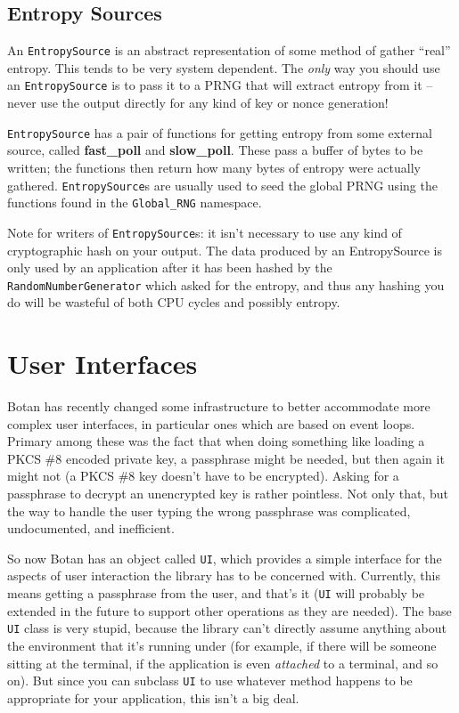 \documentclass{article}
\newcommand{\function}[1]{\textbf{#1}}
\newcommand{\type}[1]{\texttt{#1}}
\newcommand{\namespace}[1]{\texttt{#1}}
\begin{document}
\subsection{Entropy Sources}

An \type{EntropySource} is an abstract representation of some method of gather
``real'' entropy. This tends to be very system dependent. The \emph{only} way
you should use an \type{EntropySource} is to pass it to a PRNG that will
extract entropy from it -- never use the output directly for any kind of key or
nonce generation!

\type{EntropySource} has a pair of functions for getting entropy from some
external source, called \function{fast\_poll} and \function{slow\_poll}. These
pass a buffer of bytes to be written; the functions then return how many bytes
of entropy were actually gathered. \type{EntropySource}s are usually used to
seed the global PRNG using the functions found in the \namespace{Global\_RNG}
namespace.

Note for writers of \type{EntropySource}s: it isn't necessary to use any kind
of cryptographic hash on your output. The data produced by an EntropySource is
only used by an application after it has been hashed by the
\type{RandomNumberGenerator} which asked for the entropy, and thus any hashing
you do will be wasteful of both CPU cycles and possibly entropy.

\pagebreak
\section{User Interfaces}

Botan has recently changed some infrastructure to better accommodate more
complex user interfaces, in particular ones which are based on event
loops. Primary among these was the fact that when doing something like loading
a PKCS \#8 encoded private key, a passphrase might be needed, but then again it
might not (a PKCS \#8 key doesn't have to be encrypted). Asking for a
passphrase to decrypt an unencrypted key is rather pointless. Not only that,
but the way to handle the user typing the wrong passphrase was complicated,
undocumented, and inefficient.

So now Botan has an object called \type{UI}, which provides a simple interface
for the aspects of user interaction the library has to be concerned
with. Currently, this means getting a passphrase from the user, and that's it
(\type{UI} will probably be extended in the future to support other operations
as they are needed). The base \type{UI} class is very stupid, because the
library can't directly assume anything about the environment that it's running
under (for example, if there will be someone sitting at the terminal, if the
application is even \emph{attached} to a terminal, and so on). But since you
can subclass \type{UI} to use whatever method happens to be appropriate for
your application, this isn't a big deal.
\end{document}
